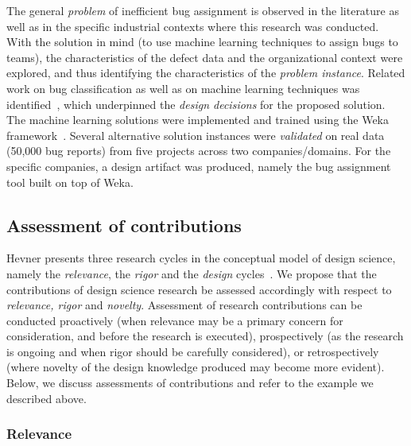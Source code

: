 \documentclass[graybox]{svmult}
\begin{document}
The general \emph{problem} of inefficient bug assignment is observed in the literature as well as in the specific industrial contexts where this research was conducted. With the solution in mind (to use machine learning techniques to assign bugs to teams), the characteristics of the defect data and the organizational context were explored, and thus  identifying the characteristics of the \emph{problem instance}. Related work on bug classification as well as on machine learning techniques was identified~\cite{Borg2013EMSE}, which underpinned the \emph{design decisions} for the proposed solution. The machine learning solutions were implemented and trained using the Weka framework~\cite{hall_weka_2009}. Several alternative solution instances were \emph{validated} on real data (50,000 bug reports) from five projects across two companies/domains. For the specific companies, a design artifact was produced, namely the bug assignment tool built on top of Weka.



\subsection{Assessment of contributions}
\label{sec:assessment}

Hevner presents three research cycles in the conceptual model of design science, namely the \emph{relevance}, the \emph{rigor} and the \emph{design} cycles~\cite{Hevner2007}. We propose that the contributions of design science research be assessed accordingly with respect to \emph{relevance, rigor} and \emph{novelty}. 
Assessment of research contributions can be conducted proactively (when relevance may be a primary concern for consideration, and before the research is executed), prospectively (as the research is ongoing and when rigor should be carefully considered), or retrospectively (where novelty of the design knowledge produced may become more evident).
Below, we discuss assessments of contributions and refer to the example we described above.




\subsubsection{Relevance} 
\end{document}
